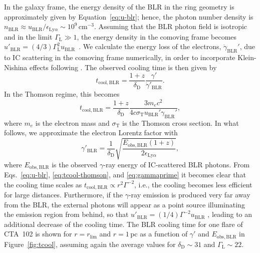 \documentclass[twocolumn]{aastex62}
\newcommand{\gray}{$\gamma$-ray\xspace}
\begin{document}
In the galaxy frame, the energy density of the BLR in the ring geometry is approximately given by Equation~\ref{eq:u-blr}; hence, the photon number density is $n_\mathrm{BLR} \approx u_\mathrm{BLR} / \epsilon_{\mathrm{Ly}\alpha}\sim10^{9}\,\mathrm{cm}^{-3}$.
Assuming that the BLR photon field is isotropic and in the limit $\Gamma_\mathrm{L} \gg 1$, the energy density in the comoving frame becomes
$u'_\mathrm{BLR} = (4/3)\Gamma_\mathrm{L}^2 u_\mathrm{BLR}$~\citep{1994ApJS...90..945D,2002ApJ...575..667D}.
We calculate the energy loss of the electrons, $\dot{\gamma}_\mathrm{BLR}'$, due to IC scattering in the comoving frame numerically, in order to incorporate Klein-Nishina   effects following \citet{1970RvMP...42..237B}.
The observed cooling time is then given by
\begin{equation}
    t_\mathrm{cool,BLR} = \frac{1 + z}{\delta_\mathrm{D}} \frac{\gamma'}{\dot{\gamma}'_\mathrm{BLR}}.
    \label{eq:tcool}
\end{equation}
In the Thomson regime, this becomes
\begin{equation}
    t_\mathrm{cool,BLR} = \frac{1+z}{\delta_\mathrm{D}}\frac{3m_ec^2}{4c\sigma_\mathrm{T}u_\mathrm{BLR}'\gamma_\mathrm{BLR}'},
    \label{eq:tcool-thomson}
\end{equation}
where $m_e$ is the electron mass and $\sigma_\mathrm{T}$ is the Thomson cross section. 
In what follows, we approximate the electron Lorentz factor with~\citep[e.g.,][]{2009herb.book.....D,finke2016}
\begin{equation}
    \gamma'_\mathrm{BLR} = \frac{1}{ \delta_\mathrm{D}}\sqrt{\frac{E_\mathrm{obs,BLR}(1+z)}{2\epsilon_{\mathrm{Ly}\alpha}}},
    \label{eq:gammaprime}
\end{equation}
where $E_\mathrm{obs,BLR}$ is the observed \gray energy of IC-scattered BLR photons. 
From Eqs.~\ref{eq:u-blr}, \ref{eq:tcool-thomson}, and \ref{eq:gammaprime} it becomes clear that the cooling time scales as $t_\mathrm{cool, BLR}\propto r^2 \Gamma^{-2}$, i.e., the cooling becomes less efficient for large distances. 
Furthermore, if the \gray emission is produced very far away from the BLR, the external photons will appear as a point source illuminating the emission region from behind, so that $u'_\mathrm{BLR} = (1/4)\Gamma^{-2} u_\mathrm{BLR}$ \citep{1994ApJS...90..945D}, leading to an additional decrease of the cooling time. 
The BLR cooling time for one flare of CTA~102 is shown for $r=r_\mathrm{lim}$ and $r = 1\,$pc as a function of $\gamma'$ and $E_\mathrm{obs,BLR}$ in Figure~\ref{fig:tcool},  
assuming again the average values for $\delta_\mathrm{D}\sim31$ and $\Gamma_\mathrm{L}\sim22$. 
\end{document}
